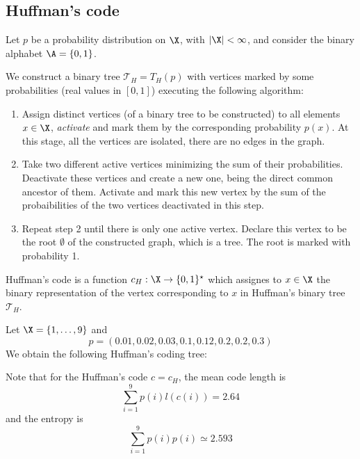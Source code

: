 \documentclass[toc]{../cs-classes/cs-classes}
\begin{document}
\subsection{Huffman's code}
Let $p$ be a probability distribution on $\X$, with $|\X|<\infty$, and consider the binary alphabet $\A=\{0, 1\}$.

\begin{definition}
    We construct a binary tree $\mathcal{T}_H = T_H(p)$ with vertices marked by some probabilities (real values in $[0, 1]$) executing the following algorithm:
    \begin{enumerate}
        \item Assign distinct vertices (of a binary tree to be constructed) to all elements $x\in\X$, \emph{activate} and mark them by the corresponding probability $p(x)$. At this stage, all the vertices are isolated, there are no edges in the graph.
        \item Take two different active vertices minimizing the sum of their probabilities. Deactivate these vertices and create a new one, being the direct common ancestor of them. Activate and mark this new vertex by the sum of the probaibilities of the two vertices deactivated in this step.
        \item Repeat step 2 until there is only one active vertex. Declare this vertex to be the root $\emptyset$ of the constructed graph, which is a tree. The root is marked with probability 1.
    \end{enumerate}
\end{definition}

\begin{definition}
    Huffman's code is a function $c_H:\X\to\{0, 1\}^\star$ which assignes to $x\in\X$ the binary representation of the vertex corresponding to $x$ in Huffman's binary tree $\mathcal{T}_H$.
\end{definition}

\begin{example}
    Let $\X=\{1, \dots, 9\}$ and 
    \begin{equation*}
        p=(0.01, 0.02, 0.03, 0.1, 0.12, 0.2, 0.2, 0.3)
    \end{equation*}
    We obtain the following Huffman's coding tree:

    Note that for the Huffman's code $c=c_H$, the mean code length is
    \begin{equation*}
        \sum_{i=1}^9 p(i)l(c(i))=2.64
    \end{equation*}
    and the entropy is
    \begin{equation*}
        \sum_{i=1}^9 p(i)p(i)\simeq 2.593
    \end{equation*}
\end{example}
\end{document}
